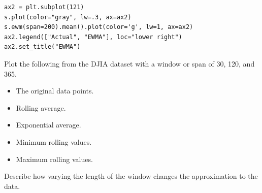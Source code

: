 \begin{lstlisting}
ax2 = plt.subplot(121)
s.plot(color="gray", lw=.3, ax=ax2)
s.ewm(span=200).mean().plot(color='g', lw=1, ax=ax2)
ax2.legend(["Actual", "EWMA"], loc="lower right")
ax2.set_title("EWMA")
\end{lstlisting}

\begin{problem}
Plot the following from the DJIA dataset with a window or span of 30, 120, and 365.
\begin{itemize}
    \item The original data points.
    \item Rolling average.
    \item Exponential average.
    \item Minimum rolling values.
    \item Maximum rolling values.
\end{itemize}
Describe how varying the length of the window changes the approximation to the data.
\end{problem}
